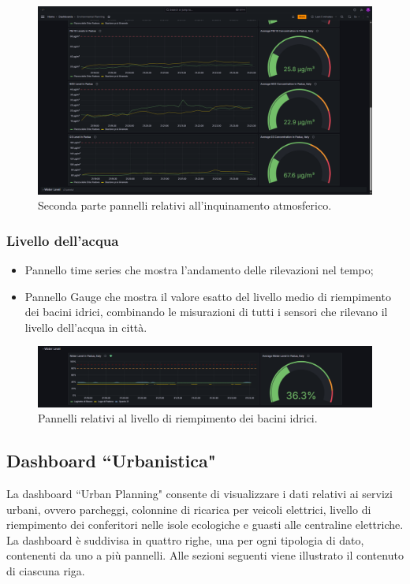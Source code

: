 \documentclass[8pt]{article}
\begin{document}
\begin{figure}[H]
    \centering
    \includegraphics[width=15cm]{images_mu/air_pollution2.png}
    \caption{Seconda parte pannelli relativi all'inquinamento atmosferico.}
    \label{fig:Seconda parte pannelli relativi all'inquinamento atmosferico}
\end{figure}
\subsubsection{Livello dell'acqua}
\begin{itemize}
\setlength\itemsep{0em}
    \item Pannello time series che mostra l'andamento delle rilevazioni nel tempo;
    \item Pannello Gauge che mostra il valore esatto del livello medio di riempimento dei bacini idrici, combinando le misurazioni di tutti i sensori che rilevano il livello dell'acqua in città.
\end{itemize}
\begin{figure}[H]
    \centering
    \includegraphics[width=15cm]{images_mu/water_level.png}
    \caption{Pannelli relativi al livello di riempimento dei bacini idrici.}
    \label{fig:Pannelli relativi al livello di riempimento dei bacini idrici.}
\end{figure}
\subsection{Dashboard ``Urbanistica"}
La dashboard ``Urban Planning" consente di visualizzare i dati relativi ai servizi urbani, ovvero parcheggi, colonnine di ricarica per veicoli elettrici, livello di riempimento dei conferitori nelle isole ecologiche e guasti alle centraline elettriche. La dashboard è suddivisa in quattro righe, una per ogni tipologia di dato, contenenti da uno a più pannelli. Alle sezioni seguenti viene illustrato il contenuto di ciascuna riga.
\end{document}
